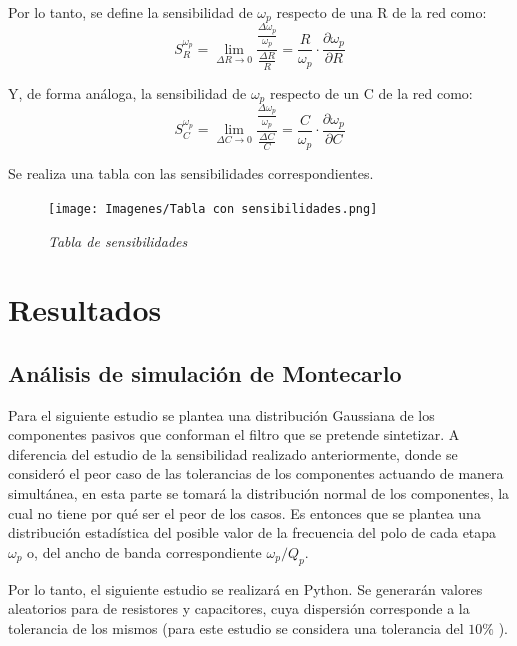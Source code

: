 \documentclass[12pt,A4paper,titlepage]{article}
\begin{document}
\bigskip
\hspace{1mm} Por lo tanto, se define la sensibilidad de \(\omega_p \) respecto de una R de la red como:
\begin{equation}
    S_R^{\omega_p} = \lim_{\Delta R \rightarrow 0} \frac{\frac{\Delta \omega_p}{\omega_p}}{\frac{\Delta R}{R}} =\frac{R}{\omega_p}\cdot \frac{\partial \omega_p}{\partial R}
\end{equation}

\hspace{1mm} Y, de forma análoga, la sensibilidad de  \(\omega_p \) respecto de un C de la red como:
\begin{equation}
    S_C^{\omega_p} = \lim_{\Delta C \rightarrow 0} \frac{\frac{\Delta \omega_p}{\omega_p}}{\frac{\Delta C}{C}} =\frac{C}{\omega_p}\cdot \frac{\partial \omega_p}{\partial C}
\end{equation}

\hspace{1mm} Se realiza una tabla con las sensibilidades correspondientes.

\begin{figure}[!h] 
  \centering
  \texttt{[image: Imagenes/Tabla con sensibilidades.png]}
  \caption{\textit{Tabla de sensibilidades}}
\end{figure}

\newpage
\section{Resultados}
\subsection{Análisis de simulación de Montecarlo}
\hspace{1mm} Para el siguiente estudio se plantea una distribución Gaussiana de los componentes pasivos que conforman el filtro que se pretende sintetizar. A diferencia del estudio de la sensibilidad realizado anteriormente, donde se consideró el peor caso de las tolerancias de los componentes actuando de manera simultánea, en esta parte se tomará la distribución normal de los componentes, la cual no tiene por qué ser el peor de los casos. Es entonces que se plantea una distribución estadística del posible valor de la frecuencia del polo de cada etapa \(\omega_p\) o, del ancho de banda correspondiente \(\omega_p/Q_p\).

\bigskip
\hspace{1mm} Por lo tanto, el siguiente estudio se realizará en Python. Se generarán valores aleatorios para de resistores y capacitores, cuya dispersión corresponde a la tolerancia de los mismos (para este estudio se considera una tolerancia del \(10\%\) ).
\end{document}
